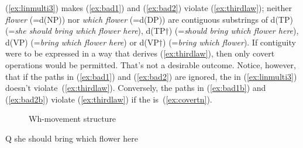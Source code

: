 \documentclass[output=paper]{langsci/langscibook}
\begin{document}
(\ref{ex:linmulti3}) makes (\ref{ex:bad1}) and (\ref{ex:bad2}) violate (\ref{ex:thirdlaw}); neither \emph{flower} (=d(NP)) nor \emph{which flower} (=d(DP)) are contiguous substrings of d(TP) (=\emph{she should bring which flower here}), d(TP$\dag$) (=\emph{should bring which flower here}), d(VP) (=\emph{bring which flower here}) or d(VP$\dag$) (=\emph{bring which flower}). If contiguity were to be expressed in a way that derives (\ref{ex:thirdlaw}), then only covert  operations would be permitted. That's not a desirable outcome. Notice, however, that if the paths in (\ref{ex:bad1}) and (\ref{ex:bad2}) are ignored, the  in (\ref{ex:linmulti3}) doesn't violate~(\ref{ex:thirdlaw}). Conversely, the paths in (\ref{ex:bad1b}) and (\ref{ex:bad2b}) violate (\ref{ex:thirdlaw}) if the  is~(\ref{ex:covertn}).

\begin{figure}
\caption{Wh-movement structure\label{ex:multi3}}
\end{figure}

\begin{exe}
	\ex \label{ex:covertn} Q she should bring which flower here
\end{exe}
\end{document}
